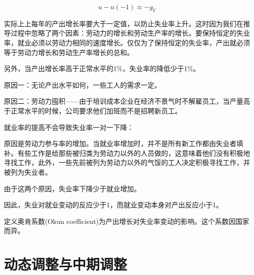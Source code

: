 \documentclass{article}
\begin{document}
\[
u-u(-1)\approx -g_Y
\]

\hspace*{\fill}

实际上上每年的产出增长率要大于一定值，以防止失业率上升。这时因为我们在推导过程中忽略了两个因素：劳动力的增长和劳动生产率的增长。要保持恒定的失业率，就业必须以劳动力相同的速度增长。仅仅为了保持恒定的失业率，产出就必须等于劳动力增长和劳动生产率增长的总和。

另外，当产出增长率高于正常水平的1\%，失业率的降低少于1\%。

原因一：无论产出水平如何，一些工人的需求一定。

原因二：劳动力囤积——由于培训成本企业在经济不景气时不解雇员工，当产量高于正常水平的时候，公司要求他们加班而不是招聘新员工。

\hspace*{\fill}

就业率的提高不会导致失业率一对一下降：

原因是劳动力参与率的增加。当就业率增加时，并不是所有新工作都由失业者填补。有些工作是给那些被归类为劳动力以外的人员做的，这意味着他们没有积极地寻找工作，此外，一些先前被列为劳动力以外的气馁的工人决定积极寻找工作，并被列为失业者。

由于这两个原因，失业率下降少于就业增加。

因此，失业对就业变动的反应少于1，而就业变动本身对产出反应小于1。

定义奥肯系数(Okun coefficient)为产出增长对失业率变动的影响。这个系数因国家而异。

\section{动态调整与中期调整}
\end{document}
